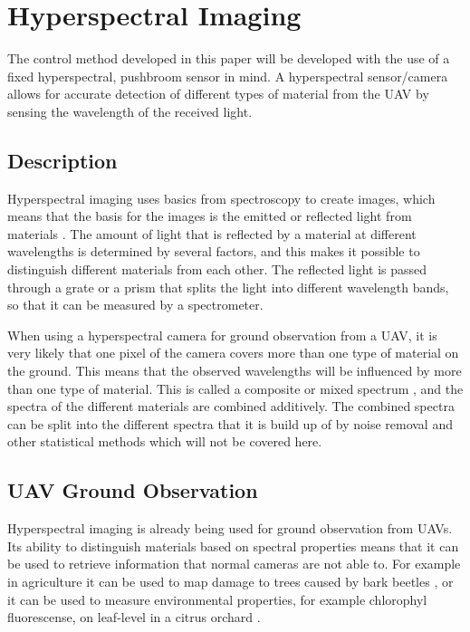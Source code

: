 \section{Hyperspectral Imaging}

The control method developed in this paper will be developed with the use of a fixed hyperspectral, pushbroom sensor in mind. A hyperspectral sensor/camera allows for accurate detection of different types of material from the UAV by sensing the wavelength of the received light.


\subsection{Description}

Hyperspectral imaging uses basics from spectroscopy to create images, which means that the basis for the images is the emitted or reflected light from materials \cite{hypSMITH}. The amount of light that is reflected by a material at different wavelengths is determined by several factors, and this makes it possible to distinguish different materials from each other. The reflected light is passed through a grate or a prism that splits the light into different wavelength bands, so that it can be measured by a spectrometer.

When using a hyperspectral camera for ground observation from a UAV, it is very likely that one pixel of the camera covers more than one type of material on the ground. This means that the observed wavelengths will be influenced by more than one type of material. This is called a composite or mixed spectrum \cite{hypSMITH}, and the spectra of the different materials are combined additively. The combined spectra can be split into the different spectra that it is build up of by noise removal and other statistical methods which will not be covered here.


\subsection{UAV Ground Observation}

Hyperspectral imaging is already being used for ground observation from UAVs. Its ability to distinguish materials based on spectral properties means that it can be used to retrieve information that normal cameras are not able to. For example in agriculture it can be used to map damage to trees caused by bark beetles \cite{beetleNASI}, or it can be used to measure environmental properties, for example chlorophyl fluorescense, on leaf-level in a citrus orchard \cite{waterStressBERNI}.

